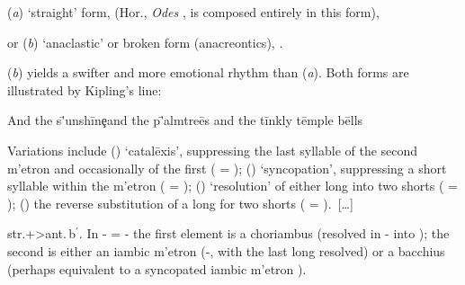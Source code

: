 \documentclass[11pt]{report}
\newcommand{\Greek}[1]{\foreignlanguage{polutonikogreek}{#1}}
\renewcommand{\(}{\begin{metrike}}
\renewcommand{\)}{\end{metrike}}
\begin{document}
\begin{list}{}{}
%
\item[(\textit{a})] `straight' form, \metra{\b\b\m\m \c \b\b\m\m}
(Hor., \textit{Odes} ,  is composed
entirely in this form),
%
\item[or (\textit{b})] `anaclastic' or broken form (anacreontics),
\metra{\b\b\m\b\c\m\b\m\m}.
\end{list}
%
(\textit{b}) yields a swifter and more emotional rhythm than
(\textit{a}). Both forms are illustrated by Kipling's line:\par
\begin{metrica}
\-And th\-e s\='unsh\=ine\c \-and th\-e p\='almtre\=es \-and th\-e
t\=inkl\-y t\=empl\-e b\=ells\ \metra[\m{-2}\ss{1.225}\ms{st}]{\K\m}%
\end{metrica}\par
Variations include () `catal\=exis', suppressing the
last syllable of the second \Greek{m'etron} and occasionally of the
first ( = \metra{\b\b\m\k\m \c \b\b\m\k\m});
() `syncopation', suppressing a short syllable within
the \Greek{m'etron} ( = \metra{\b\b\m\b\c\m\p\m\m});
() `resolution' of either long into two shorts
( = \metra{\b\b\bb\m\c\b\b\m\m}); ()
the reverse substitution of a long for two shorts
( = \metra{\m\m\m\c\b\b\m\m}).\ [\ldots]

\Greek{str.}+\Greek{>ant.\,b$^\prime$}. In %
- = - the first element
is a choriambus \metra{\m\b\b\m} (resolved in
- into \metra{\bb\b\b\bb}); the
second is either an iambic \Greek{m'etron}
(-, with the last long resolved)
or a bacchius \metra{\b\m\m} (perhaps equivalent to a syncopated
iambic \Greek{m'etron} \metra{\b\m\p\m}). 
\end{document}
